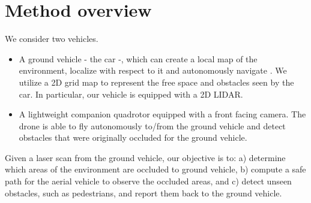 
\section{Method overview}

We consider two vehicles.
\begin{itemize}
\item
A ground vehicle - the car -, which can create a local map of the environment, localize with respect to it and autonomously navigate \cite{Add citation to Felix's IV paper}. We utilize a 2D grid map to represent the free space and obstacles seen by the car. In particular, our vehicle is equipped with a 2D LIDAR. 
\item
A lightweight companion quadrotor \cite{Parrot Bebop 2} equipped with a front facing camera. The drone is able to fly autonomously to/from the ground vehicle and detect obstacles that were originally occluded for the ground vehicle.
\end{itemize}

Given a laser scan from the ground vehicle, our objective is to:
a) determine which areas of the environment are occluded to ground vehicle,
b) compute a safe path for the aerial vehicle to observe the occluded areas, and
c) detect unseen obstacles, such as pedestrians, and report them back to the ground vehicle.


%
%
%


